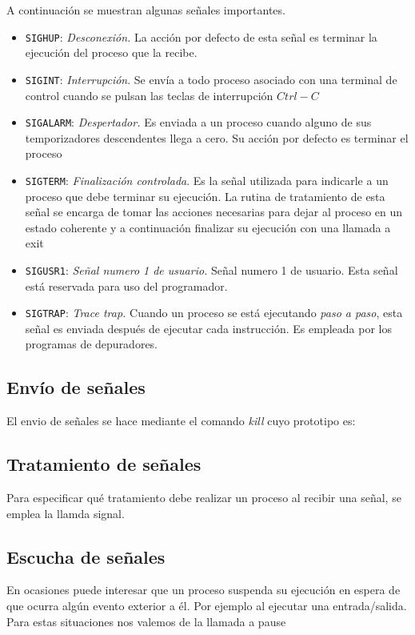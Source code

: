 \documentclass{article}
\begin{document}
	A continuación se muestran algunas señales importantes.
	\begin{itemize}
		\item \texttt{SIGHUP}: \textit{Desconexión.} La acción por defecto de esta señal es terminar la ejecución del proceso que la recibe.
		\item  \texttt{SIGINT}: \textit{Interrupción}. Se envía a todo proceso asociado con una terminal de control cuando se pulsan las teclas de interrupción $Ctrl-C$
		\item \texttt{SIGALARM}: \textit{Despertador.} Es enviada a un proceso cuando alguno de sus temporizadores descendentes llega a cero. Su acción por defecto es terminar el proceso
		\item \texttt{SIGTERM}: \textit{Finalización controlada}. Es la señal utilizada para indicarle a un proceso que debe terminar su ejecución.
		La rutina de tratamiento de esta señal se encarga de tomar las acciones necesarias para dejar al proceso	en un estado coherente y a continuación finalizar su ejecución con una llamada a exit
		\item \texttt{SIGUSR1}: \textit{Señal numero 1 de usuario.} Señal numero 1 de usuario. Esta señal está reservada para uso del programador.
		\item \texttt{SIGTRAP}: \textit{Trace trap.} Cuando un proceso se está ejecutando \textit{paso a paso}, esta señal es enviada después de ejecutar cada instrucción. Es empleada por los programas de depuradores.
	\end{itemize}
	
	\subsection{Envío de señales}
	El envio de señales se hace mediante el comando \textit{kill} cuyo prototipo es:
	 \subsection{Tratamiento de señales}
	 Para especificar qué tratamiento debe realizar un proceso al recibir una señal, se emplea la llamda \ttfamily signal.\\
	\subsection{Escucha de señales}
	En ocasiones puede interesar que un proceso suspenda su ejecución en espera de que ocurra algún evento exterior a él. Por ejemplo al ejecutar una entrada/salida. Para estas situaciones nos valemos de la llamada a \ttfamily pause\\
\end{document}

